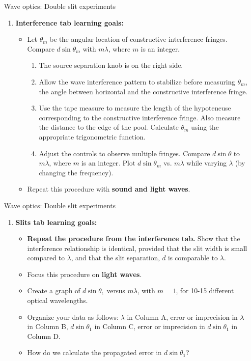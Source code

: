 \documentclass{beamer}
\begin{document}
\begin{frame}{Wave optics: Double slit experiments}
\footnotesize
\begin{enumerate}
\item \textbf{Interference tab learning goals:}
\begin{itemize}
\footnotesize
\item Let $\theta_m$ be the angular location of constructive interference fringes.  Compare $d\sin\theta_m$ with $m\lambda$, where $m$ is an integer.
\begin{enumerate}
\item The source separation knob is on the right side.
\item Allow the wave interference pattern to stabilize before measuring $\theta_m$, the angle between horizontal and the constructive interference fringe.
\item Use the tape measure to measure the length of the hypoteneuse corresponding to the constructive interference fringe.  Also measure the distance to the edge of the pool.  Calculate $\theta_m$ using the appropriate trigonometric function.
\item Adjust the controls to observe multiple fringes.  Compare $d\sin\theta$ to $m \lambda$, where $m$ is an integer.  Plot $d\sin\theta_m$ vs. $m\lambda$ while varying $\lambda$ (by changing the frequency).
\end{enumerate}
\item Repeat this procedure with \textbf{\alert{sound and light waves}}.
\end{itemize}
\end{enumerate}
\end{frame}

\begin{frame}{Wave optics: Double slit experiments}
\footnotesize
\begin{enumerate}
\item \textbf{Slits tab learning goals:}
\begin{itemize}
\footnotesize
\item \textbf{Repeat the procedure from the interference tab.}  Show that the interference relationship is identical, provided that the slit width is small compared to $\lambda$, and that the slit separation, $d$ is comparable to $\lambda$.
\item Focus this procedure on \textbf{\alert{light waves}}.
\item Create a graph of $d\sin\theta_1$ versus $m\lambda$, with $m = 1$, for 10-15 different optical wavelengths.
\item Organize your data as follows: $\lambda$ in Column A, error or imprecision in $\lambda$ in Column B, $d\sin\theta_1$ in Column C, error or imprecision in $d\sin\theta_1$ in Column D.
\item How do we calculate the propagated error in $d\sin\theta_1$?
\end{itemize}
\end{enumerate}
\end{frame}
\end{document}
